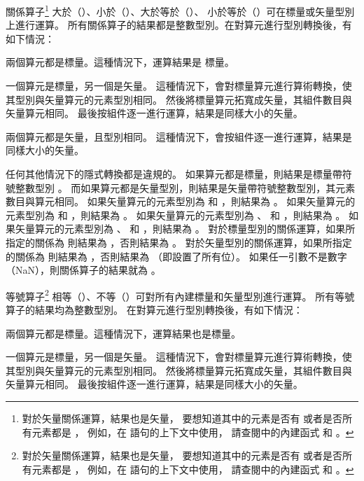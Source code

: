 {%
\startitem
關係算子\footnote{
對於矢量關係運算，結果也是矢量，
要想知道其中的元素是否有  或者是否所有元素都是 ，
例如，在  語句的上下文中使用，
請查閱中的內建函式  和 。}
大於（\ccmm{>}）、小於（\ccmm{<}）、大於等於（\ccmm{>=}）、
小於等於（\ccmm{<=}）可在標量或矢量型別上進行運算。
所有關係算子的結果都是整數型別。在對算元進行型別轉換後，有如下情況：
\startigBig
\item 兩個算元都是標量。這種情況下，運算結果是  標量。

\item 一個算元是標量，另一個是矢量。
這種情況下，會對標量算元進行算術轉換，使其型別與矢量算元的元素型別相同。
然後將標量算元拓寬成矢量，其組件數目與矢量算元相同。
最後按組件逐一進行運算，結果是同樣大小的矢量。

\item 兩個算元都是矢量，且型別相同。
這種情況下，會按組件逐一進行運算，結果是同樣大小的矢量。
\stopigBig

任何其他情況下的隱式轉換都是違規的。
如果算元都是標量，則結果是標量帶符號整數型別 。
而如果算元都是矢量型別，則結果是矢量帶符號整數型別，其元素數目與算元相同。
如果矢量算元的元素型別為  和 ，則結果為 。
如果矢量算元的元素型別為  和 ，則結果為 。
如果矢量算元的元素型別為 、  和 ，則結果為 。
如果矢量算元的元素型別為 、  和 ，則結果為 。
對於標量型別的關係運算，如果所指定的關係為  則結果為 ，否則結果為 。
對於矢量型別的關係運算，如果所指定的關係為  則結果為 ，否則結果為  （即設置了所有位）。
如果任一引數不是數字（NaN），則關係算子的結果就為 。
\stopitem

\startitem
等號算子\footnote{
對於矢量關係運算，結果也是矢量，
要想知道其中的元素是否有  或者是否所有元素都是 ，
例如，在  語句的上下文中使用，
請查閱中的內建函式  和 。}
相等（\ccmm{==}）、不等（\ccmm{!=}）可對所有內建標量和矢量型別進行運算。
所有等號算子的結果均為整數型別。
在對算元進行型別轉換後，有如下情況：
\startigBig
\item 兩個算元都是標量。這種情況下，運算結果也是標量。

\item 一個算元是標量，另一個是矢量。
這種情況下，會對標量算元進行算術轉換，使其型別與矢量算元的元素型別相同。
然後將標量算元拓寬成矢量，其組件數目與矢量算元相同。
最後按組件逐一進行運算，結果是同樣大小的矢量。

}
